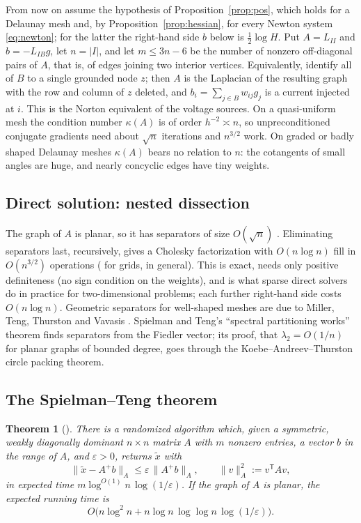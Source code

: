 \documentclass[11pt]{amsart}
\newtheorem{theorem}{Theorem}[section]
\theoremstyle{definition}
\theoremstyle{remark}
\newcommand{\eps}{\varepsilon}
\begin{document}
From now on assume the hypothesis of Proposition~\ref{prop:pos}, which holds for a Delaunay mesh and, by Proposition~\ref{prop:hessian}, for every Newton system \eqref{eq:newton}; for the latter the right-hand side $b$ below is $\frac12\log H$. Put $A=L_{II}$ and $b=-L_{IB}g$, let $n=|I|$, and let $m\le3n-6$ be the number of nonzero off-diagonal pairs of $A$, that is, of edges joining two interior vertices.
Equivalently, identify all of $B$ to a single grounded node $z$; then $A$ is the Laplacian of the resulting graph with the row and column of $z$ deleted, and
$b_i=\sum_{j\in B}w_{ij}g_j$ is a current injected at $i$. This is the Norton equivalent of the voltage sources. On a quasi-uniform mesh the condition number $\kappa(A)$ is of order $h^{-2}\asymp n$,
so unpreconditioned conjugate gradients need about $\sqrt n$ iterations and $n^{3/2}$ work. On graded or badly shaped Delaunay meshes $\kappa(A)$ bears no relation to $n$:
the cotangents of small angles are huge, and nearly concyclic edges have tiny weights.

\subsection{Direct solution: nested dissection}
The graph of $A$ is planar, so it has separators of size $O(\sqrt n)$ \cite{LT79}. Eliminating separators last, recursively, gives a Cholesky factorization with $O(n\log n)$ fill
in $O(n^{3/2})$ operations (\cite{Geo73} for grids, \cite{LRT79} in general). This is exact, needs only positive definiteness (no sign condition on the weights), and
is what sparse direct solvers do in practice for two-dimensional problems; each further right-hand side costs $O(n\log n)$. Geometric separators for well-shaped meshes are due to Miller, Teng, Thurston and Vavasis \cite{MTTV97}.
Spielman and Teng's ``spectral partitioning works'' theorem \cite{ST96} finds separators from the Fiedler vector; its proof, that $\lambda_2=O(1/n)$ for planar graphs of bounded degree, goes
through the Koebe--Andreev--Thurston circle packing theorem.

\subsection{The Spielman--Teng theorem}

\begin{theorem}[\cite{ST04,STsolve}]\label{thm:ST}
There is a randomized algorithm which, given a symmetric, weakly diagonally dominant $n\times n$ matrix $A$ with $m$ nonzero entries, a vector $b$ in the range of $A$, and $\eps>0$, returns $\tilde x$ with
\[
\|\tilde x-A^{+}b\|_A\le\eps\,\|A^{+}b\|_A,\qquad \|v\|_A^2:=v^{\mathsf T}Av,
\]
in expected time $m\log^{O(1)}n\,\log(1/\eps)$. If the graph of $A$ is planar, the expected running time is
\[
O\bigl(n\log^2n+n\log n\,\log\log n\,\log(1/\eps)\bigr).
\]
\end{theorem}
\end{document}
